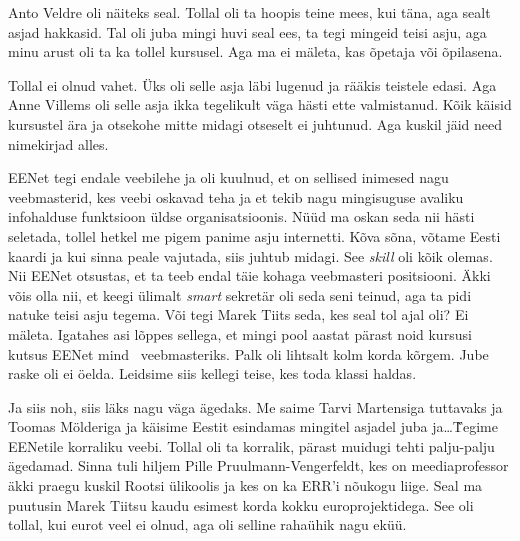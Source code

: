 Anto Veldre oli näiteks seal. Tollal oli ta hoopis 
teine mees, kui täna, aga sealt asjad hakkasid. Tal oli juba mingi huvi seal 
ees, ta tegi mingeid teisi asju, aga minu arust oli ta ka tollel kursusel. Aga 
ma ei mäleta, kas õpetaja või õpilasena.


Tollal ei olnud vahet. Üks oli selle asja läbi lugenud ja rääkis teistele 
edasi. Aga Anne Villems oli selle asja ikka 
tegelikult väga hästi ette valmistanud. Kõik käisid kursustel ära ja otsekohe mitte 
midagi otseselt ei juhtunud. Aga kuskil jäid need nimekirjad alles. 

EENet tegi endale veebilehe ja oli kuulnud, et on sellised 
inimesed nagu veebmasterid, kes veebi oskavad teha ja et tekib nagu mingisuguse 
avaliku infohalduse funktsioon üldse organisatsioonis. Nüüd ma oskan seda nii 
hästi seletada, tollel hetkel me pigem panime asju internetti. Kõva sõna, 
võtame Eesti kaardi ja kui sinna peale vajutada, siis juhtub midagi. See 
\emph{skill} oli kõik olemas. Nii EENet otsustas, et ta teeb  endal täie 
kohaga veebmasteri positsiooni. Äkki võis olla nii, et keegi ülimalt \emph{smart} 
sekretär oli seda seni teinud, aga ta pidi natuke teisi asju tegema. Või tegi Marek 
Tiits seda, kes seal tol ajal oli? Ei mäleta. Igatahes 
asi lõppes sellega, et mingi pool aastat pärast noid kursusi  kutsus EENet mind 
veebmasteriks. Palk oli lihtsalt kolm korda kõrgem. Jube raske oli ei öelda. 
Leidsime siis kellegi teise, kes toda klassi haldas. 

Ja siis noh, siis läks  nagu väga ägedaks. Me saime Tarvi 
Martensiga tuttavaks ja Toomas 
Mölderiga ja käisime Eestit esindamas mingitel 
asjadel juba ja\ldots\~ Tegime EENetile korraliku veebi. Tollal oli ta korralik, 
pärast muidugi tehti palju-palju ägedamad. Sinna tuli hiljem Pille 
Pruulmann-Vengerfeldt, kes on 
meediaprofessor äkki praegu kuskil Rootsi ülikoolis ja kes on ka 
ERR'i nõukogu 
liige. Seal ma puutusin Marek Tiitsu kaudu esimest 
korda kokku europrojektidega. See oli tollal, kui eurot veel ei olnud, aga oli 
selline rahaühik nagu eküü. 

